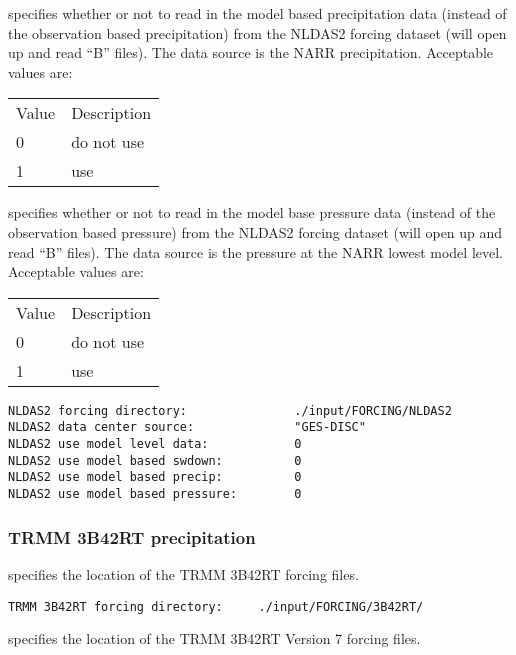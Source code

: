   specifies whether or not
 to read in the model based precipitation data (instead of the 
 observation based precipitation) from the NLDAS2 forcing  
 dataset (will open up and read ``B'' files).  The data source
 is the NARR precipitation.
 Acceptable values are:

 \begin{tabular}{ll}
 Value & Description \\
 0     & do not use  \\
 1     & use         \\
 \end{tabular}

  specifies whether or
 not to read in the model base pressure data (instead of the 
 observation based pressure) from the NLDAS2 forcing dataset
 (will open up and read ``B'' files).  The data source is
 the pressure at the NARR lowest model level.
 Acceptable values are:

 \begin{tabular}{ll}
 Value & Description \\
 0     & do not use  \\
 1     & use         \\
 \end{tabular}
 

 \begin{Verbatim}[frame=single]
NLDAS2 forcing directory:               ./input/FORCING/NLDAS2
NLDAS2 data center source:              "GES-DISC"
NLDAS2 use model level data:            0
NLDAS2 use model based swdown:          0
NLDAS2 use model based precip:          0
NLDAS2 use model based pressure:        0
 \end{Verbatim}

 
 \subsubsection{TRMM 3B42RT precipitation} \label{sssec:supp_3b42rt}
 

 
  specifies the location of the
 TRMM 3B42RT forcing files.
 

 \begin{Verbatim}[frame=single]
TRMM 3B42RT forcing directory:     ./input/FORCING/3B42RT/
 \end{Verbatim}

 
  specifies the location of the
 TRMM 3B42RT Version 7 forcing files.
 

